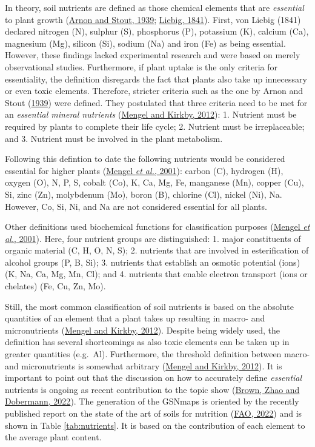 \documentclass[
  10pt,
  b5paper,
  oneside]{book}
\begin{document}
In theory, soil nutrients are defined as those chemical elements that are \emph{essential} to plant growth (\protect\hyperlink{ref-arnon1939}{Arnon and Stout, 1939}; \protect\hyperlink{ref-vonLiebig1841}{Liebig, 1841}). First, von Liebig (1841) declared nitrogen (N), sulphur (S), phosphorus (P), potassium (K), calcium (Ca), magnesium (Mg), silicon (Si), sodium (Na) and iron (Fe) as being essential. However, these findings lacked experimental research and were based on merely observational studies. Furthermore, if plant uptake is the only criteria for essentiality, the definition disregards the fact that plants also take up innecessary or even toxic elements.
Therefore, stricter criteria such as the one by Arnon and Stout (\protect\hyperlink{ref-arnon1939}{1939}) were defined. They postulated that three criteria need to be met for an \emph{essential mineral nutrients} (\protect\hyperlink{ref-mengel2012}{Mengel and Kirkby, 2012}):
1. Nutrient must be required by plants to complete their life cycle;
2. Nutrient must be irreplaceable; and
3. Nutrient must be involved in the plant metabolism.

Following this defintion to date the following nutrients would be considered essential for higher plants (\protect\hyperlink{ref-mengel2001}{Mengel \emph{et al.}, 2001}): carbon (C), hydrogen (H), oxygen (O), N, P, S, cobalt (Co), K, Ca, Mg, Fe, manganese (Mn), copper (Cu), Si, zinc (Zn), molybdenum (Mo), boron (B), chlorine (Cl), nickel (Ni), Na. However, Co, Si, Ni, and Na are not considered essential for all plants.

Other definitions used biochemical functions for classification purposes (\protect\hyperlink{ref-mengel2001}{Mengel \emph{et al.}, 2001}). Here, four nutrient groups are distinguished:
1. major constituents of organic material (C, H, O, N, S);
2. nutrients that are involved in esterification of alcohol groups (P, B, Si);
3. nutrients that establish an osmotic potential (ions) (K, Na, Ca, Mg, Mn, Cl); and
4. nutrients that enable electron transport (ions or chelates) (Fe, Cu, Zn, Mo).

Still, the most common classification of soil nutrients is based on the absolute quantities of an element that a plant takes up resulting in macro- and micronutrients (\protect\hyperlink{ref-mengel2012}{Mengel and Kirkby, 2012}). Despite being widely used, the definition has several shortcomings as also toxic elements can be taken up in greater quantities (e.g.~Al). Furthermore, the threshold definition between macro- and micronutrients is somewhat arbitrary (\protect\hyperlink{ref-mengel2012}{Mengel and Kirkby, 2012}).
It is important to point out that the discussion on how to accurately define \emph{essential} nutrients is ongoing as recent contribution to the topic show (\protect\hyperlink{ref-brown2022}{Brown, Zhao and Dobermann, 2022}). The generation of the GSNmaps is oriented by the recently published report on the state of the art of soils for nutrition (\protect\hyperlink{ref-symposium2022}{FAO, 2022}) and is shown in Table \ref{tab:nutrients}. It is based on the contribution of each element to the average plant content.
\end{document}
